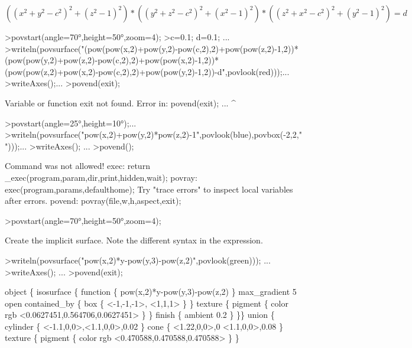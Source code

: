 \documentclass[a4paper,10pt]{article}
\begin{document}
\begin{eulernotebook}
\begin{eulercomment}
\begin{eulercomment}
\begin{eulercomment}
\end{eulercomment}
\begin{eulerformula}
\[
((x^2+y^2-c^2)^2+(z^2-1)^2)*((y^2+z^2-c^2)^2+(x^2-1)^2)*((z^2+x^2-c^2)^2+(y^2-1)^2)=d
\]
\end{eulerformula}
\begin{eulerprompt}
>povstart(angle=70°,height=50°,zoom=4);
>c=0.1; d=0.1; ...
>writeln(povsurface("(pow(pow(x,2)+pow(y,2)-pow(c,2),2)+pow(pow(z,2)-1,2))*(pow(pow(y,2)+pow(z,2)-pow(c,2),2)+pow(pow(x,2)-1,2))*(pow(pow(z,2)+pow(x,2)-pow(c,2),2)+pow(pow(y,2)-1,2))-d",povlook(red)));...
>writeAxes();...
>povend(exit);
\end{eulerprompt}
\begin{euleroutput}
  Variable or function exit not found.
  Error in:
  povend(exit); ...
             ^
\end{euleroutput}
\begin{eulerprompt}
>povstart(angle=25°,height=10°);...
>writeln(povsurface("pow(x,2)+pow(y,2)*pow(z,2)-1",povlook(blue),povbox(-2,2,"")));...
>writeAxes(); ...
>povend(); 
\end{eulerprompt}
\begin{euleroutput}
  Command was not allowed!
  exec:
      return _exec(program,param,dir,print,hidden,wait);
  povray:
      exec(program,params,defaulthome);
  Try "trace errors" to inspect local variables after errors.
  povend:
      povray(file,w,h,aspect,exit); 
\end{euleroutput}
\begin{eulerprompt}
>povstart(angle=70°,height=50°,zoom=4);
\end{eulerprompt}
\begin{eulercomment}
Create the implicit surface. Note the different syntax in the
expression.
\end{eulercomment}
\begin{eulerprompt}
>writeln(povsurface("pow(x,2)*y-pow(y,3)-pow(z,2)",povlook(green))); ...
>writeAxes(); ...
>povend(exit);
\end{eulerprompt}
\begin{euleroutput}
  object \{
  isosurface \{
  function \{ pow(x,2)*y-pow(y,3)-pow(z,2) \}
  max_gradient 5
  open
  contained_by \{ box \{ <-1,-1,-1>, <1,1,1>
   \} \}
   texture \{ pigment \{ color rgb <0.0627451,0.564706,0.0627451> \}  \} 
   finish \{ ambient 0.2 \} 
  \}\}
  union \{
    cylinder \{ <-1.1,0,0>,<1.1,0,0>,0.02 \}
    cone \{ 
      <1.22,0,0>,0
      <1.1,0,0>,0.08
    \}
    texture \{ pigment \{ color rgb <0.470588,0.470588,0.470588> \} \}

\end{euleroutput}
\end{eulercomment}
\end{eulercomment}
\end{eulernotebook}
\end{document}
